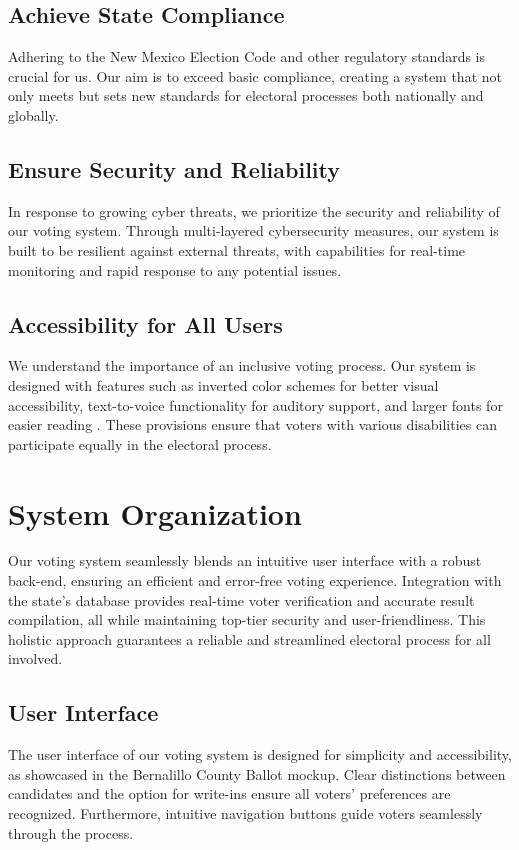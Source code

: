 \documentclass{article}
\begin{document}
\subsection{Achieve State Compliance}
Adhering to the New Mexico Election Code and other regulatory standards is crucial for us. Our aim is to exceed basic compliance, creating a system that not only meets but sets new standards for electoral processes both nationally and globally.

\subsection{Ensure Security and Reliability}
In response to growing cyber threats, we prioritize the security and reliability of our voting system. Through multi-layered cybersecurity measures, our system is built to be resilient against external threats, with capabilities for real-time monitoring and rapid response to any potential issues.

\subsection{Accessibility for All Users}
We understand the importance of an inclusive voting process. Our system is designed with features such as inverted color schemes for better visual accessibility, text-to-voice functionality for auditory support, and larger fonts for easier reading \cite{nmDisabilitiesVotingSystem}. These provisions ensure that voters with various disabilities can participate equally in the electoral process.

\section{System Organization}
Our voting system seamlessly blends an intuitive user interface with a robust back-end, ensuring an efficient and error-free voting experience. Integration with the state's database provides real-time voter verification and accurate result compilation, all while maintaining top-tier security and user-friendliness. This holistic approach guarantees a reliable and streamlined electoral process for all involved.

\subsection{User Interface}
The user interface of our voting system is designed for simplicity and accessibility, as showcased in the Bernalillo County Ballot mockup. Clear distinctions between candidates and the option for write-ins ensure all voters' preferences are recognized. Furthermore, intuitive navigation buttons guide voters seamlessly through the process.
\end{document}
